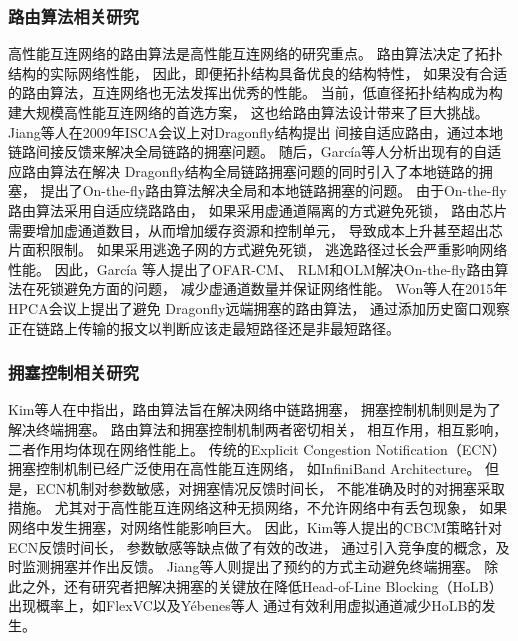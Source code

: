 \subsubsection{路由算法相关研究}
高性能互连网络的路由算法是高性能互连网络的研究重点。
路由算法决定了拓扑结构的实际网络性能，
因此，即便拓扑结构具备优良的结构特性，
如果没有合适的路由算法，互连网络也无法发挥出优秀的性能。
当前，低直径拓扑结构成为构建大规模高性能互连网络的首选方案，
这也给路由算法设计带来了巨大挑战。
Jiang等人在2009年ISCA会议上对Dragonfly结构提出
间接自适应路由，通过本地链路间接反馈来解决全局链路的拥塞问题。
随后，Garc\'ia等人分析出现有的自适应路由算法在解决
Dragonfly结构全局链路拥塞问题的同时引入了本地链路的拥塞，
提出了On-the-fly路由算法解决全局和本地链路拥塞的问题。
由于On-the-fly路由算法采用自适应绕路路由，
如果采用虚通道隔离的方式避免死锁，
路由芯片需要增加虚通道数目，从而增加缓存资源和控制单元，
导致成本上升甚至超出芯片面积限制。
如果采用逃逸子网的方式避免死锁，
逃逸路径过长会严重影响网络性能。
因此，Garc\'ia 等人提出了OFAR-CM、
RLM和OLM解决On-the-fly路由算法在死锁避免方面的问题，
减少虚通道数量并保证网络性能。
Won等人在2015年HPCA会议上提出了避免
Dragonfly远端拥塞的路由算法，
通过添加历史窗口观察正在链路上传输的报文以判断应该走最短路径还是非最短路径。

\subsubsection{拥塞控制相关研究}
Kim等人在中指出，路由算法旨在解决网络中链路拥塞，
拥塞控制机制则是为了解决终端拥塞。
路由算法和拥塞控制机制两者密切相关，
相互作用，相互影响，二者作用均体现在网络性能上。
传统的Explicit Congestion Notification（ECN）
拥塞控制机制已经广泛使用在高性能互连网络，
如InfiniBand Architecture。
但是，ECN机制对参数敏感，对拥塞情况反馈时间长，
不能准确及时的对拥塞采取措施。
尤其对于高性能互连网络这种无损网络，不允许网络中有丢包现象，
如果网络中发生拥塞，对网络性能影响巨大。
因此，Kim等人提出的CBCM策略针对ECN反馈时间长，
参数敏感等缺点做了有效的改进，
通过引入竞争度的概念，及时监测拥塞并作出反馈。
Jiang等人则提出了预约的方式主动避免终端拥塞。
除此之外，还有研究者把解决拥塞的关键放在降低Head-of-Line Blocking（HoLB）
出现概率上，如FlexVC以及Y\'ebenes等人
通过有效利用虚拟通道减少HoLB的发生。
\\                              %

